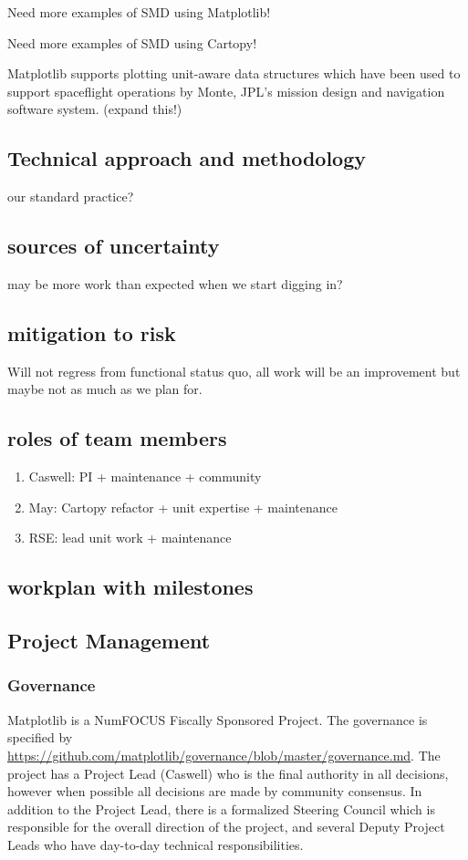 \documentclass[12pt]{article}
\numberwithin{page}{section}
\begin{document}
Need more examples of SMD using Matplotlib!

Need more examples of SMD using Cartopy!

Matplotlib supports plotting unit-aware data structures which have
been used to support spaceflight operations by Monte, JPL's mission
design and navigation software system. (expand this!)

\subsection{Technical approach and methodology}

our standard practice?

\subsection{sources of uncertainty}

may be more work than expected when we start digging in?

\subsection{mitigation to risk}

Will not regress from functional status quo, all work will be an
improvement but maybe not as much as we plan for.

\subsection{roles of team members}
\begin{enumerate}
\item Caswell: PI + maintenance + community
\item May: Cartopy refactor + unit expertise + maintenance
\item RSE: lead unit work + maintenance
\end{enumerate}
\subsection{workplan with milestones}

\subsection{Project Management}
\subsubsection{Governance}
Matplotlib is a NumFOCUS Fiscally Sponsored Project.  The governance
is specified by
\url{https://github.com/matplotlib/governance/blob/master/governance.md}.
The project has a Project Lead (Caswell) who is the final authority in
all decisions, however when possible all decisions are made by
community consensus.  In addition to the Project Lead, there is a
formalized Steering Council which is responsible for the overall
direction of the project, and several Deputy Project Leads who have
day-to-day technical responsibilities.
\end{document}

